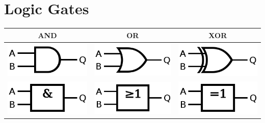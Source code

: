 \section{Logic Gates}
\begin{tabular}{|c|c|c|}
	\hline
	AND & OR & XOR \\
	\hline
	\includegraphics[width=.3\columnwidth]{"Images/AND_ANSI.png"}&
	\includegraphics[width=.3\columnwidth]{"Images/OR_ANSI.png"}&
	\includegraphics[width=.3\columnwidth]{"Images/XOR_ANSI.png"}\\
	\hline
	\includegraphics[width=.3\columnwidth]{"Images/AND_IEC.png"}&
	\includegraphics[width=.3\columnwidth]{"Images/OR_IEC.png"}&
	\includegraphics[width=.3\columnwidth]{"Images/XOR_IEC.png"}\\
	\hline
\end{tabular}